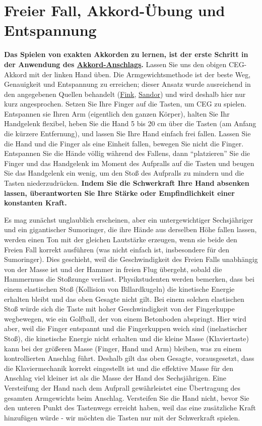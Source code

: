 
\section{Freier Fall, Akkord-Übung und Entspannung}
\label{c1ii10}

\textbf{Das Spielen von exakten Akkorden zu lernen, ist der erste Schritt in der Anwendung des \hyperref[c1ii9]{Akkord-Anschlags}.}
Lassen Sie uns den obigen CEG-Akkord mit der linken Hand üben.
Die Armgewichtsmethode ist der beste Weg, Genauigkeit und Entspannung zu erreichen; dieser Ansatz wurde ausreichend in den angegebenen Quellen behandelt (\hyperref[Fink]{Fink}, \hyperref[Sandor]{Sandor}) und wird deshalb hier nur kurz angesprochen.
Setzen Sie Ihre Finger auf die Tasten, um CEG zu spielen.
Entspannen sie Ihren Arm (eigentlich den ganzen Körper), halten Sie Ihr Handgelenk flexibel, heben Sie die Hand 5 bis 20 cm über die Tasten (am Anfang die kürzere Entfernung), und lassen Sie Ihre Hand einfach frei fallen.
Lassen Sie die Hand und die Finger als eine Einheit fallen, bewegen Sie nicht die Finger.
Entspannen Sie die Hände völlig während des Fallens, dann \enquote{platzieren} Sie die Finger und das Handgelenk im Moment des Aufpralls auf die Tasten und beugen Sie das Handgelenk ein wenig, um den Stoß des Aufpralls zu mindern und die Tasten niederzudrücken.
\textbf{Indem Sie die Schwerkraft Ihre Hand absenken lassen, überantworten Sie Ihre Stärke oder Empfindlichkeit einer konstanten Kraft.}

Es mag zunächst unglaublich erscheinen, aber ein untergewichtiger Sechsjähriger und ein gigantischer Sumoringer, die ihre Hände aus derselben Höhe fallen lassen, werden einen Ton mit der gleichen Lautstärke erzeugen, wenn sie beide den Freien Fall korrekt ausführen (was nicht einfach ist, insbesondere für den Sumoringer).
Dies geschieht, weil die Geschwindigkeit des Freien Falls unabhängig von der Masse ist und der Hammer in freien Flug übergeht, sobald die Hammernuss die Stoßzunge verlässt.
Physikstudenten werden bemerken, dass bei einem elastischen Stoß (Kollision von Billardkugeln) die kinetische Energie erhalten bleibt und das oben Gesagte nicht gilt.
Bei einem solchen elastischen Stoß würde sich die Taste mit hoher Geschwindigkeit von der Fingerkuppe wegbewegen, wie ein Golfball, der von einem Betonboden abspringt.
Hier wird aber, weil die Finger entspannt und die Fingerkuppen weich sind (inelastischer Stoß), die kinetische Energie nicht erhalten und die kleine Masse (Klaviertaste) kann bei der größeren Masse (Finger, Hand und Arm) bleiben, was zu einem kontrollierten Anschlag führt.
Deshalb gilt das oben Gesagte, vorausgesetzt, dass die Klaviermechanik korrekt eingestellt ist und die effektive Masse für den Anschlag viel kleiner ist als die Masse der Hand des Sechsjährigen.
Eine Versteifung der Hand nach dem Aufprall gewährleistet eine Übertragung des gesamten Armgewichts beim Anschlag.
Versteifen Sie die Hand nicht, bevor Sie den unteren Punkt des Tastenwegs erreicht haben, weil das eine zusätzliche Kraft hinzufügen würde - wir möchten die Tasten nur mit der Schwerkraft spielen.

